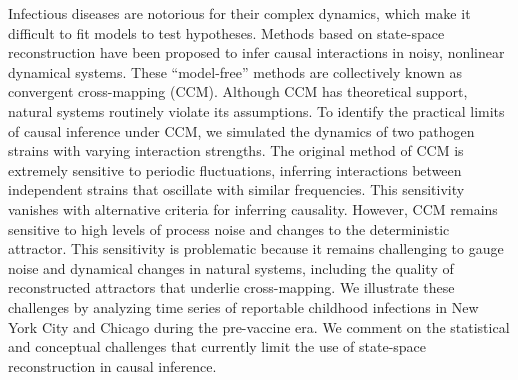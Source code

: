 Infectious diseases are notorious for their complex dynamics, which make it difficult to fit models to test hypotheses.
Methods based on state-space reconstruction have been proposed to infer causal interactions in noisy, nonlinear dynamical systems.
These ``model-free'' methods are collectively known as convergent cross-mapping (CCM).
Although CCM has theoretical support, natural systems routinely violate its assumptions.
To identify the practical limits of causal inference under CCM, we simulated the dynamics of two pathogen strains with varying interaction strengths.
The original method of CCM is extremely sensitive to periodic fluctuations, inferring interactions between independent strains that oscillate with similar frequencies.
This sensitivity vanishes with alternative criteria for inferring causality.
However, CCM remains sensitive to high levels of process noise and changes to the deterministic attractor.
This sensitivity is problematic because it remains challenging to gauge noise and dynamical changes in natural systems, including the quality of reconstructed attractors that underlie cross-mapping.
We illustrate these challenges by analyzing time series of reportable childhood infections in New York City and Chicago during the pre-vaccine era.
We comment on the statistical and conceptual challenges that currently limit the use of state-space reconstruction in causal inference.
